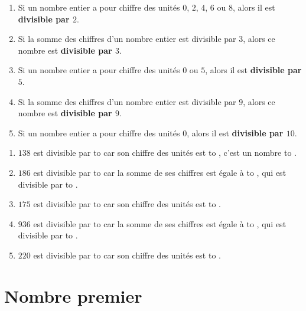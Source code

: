 \documentclass[12pt]{article}
\newif\iftrou\troutrue
\newlength{\trouwidth}
\newcommand{\trou}[1]{%
	\iftrou%
	\settowidth{\trouwidth}{#1}%
	\hbox to \trouwidth{\dotfill}%
	\else%
	#1%
	\fi}
\begin{document}
\begin{prop}{}{}
	\begin{enumerate}
		\item Si un nombre entier a pour chiffre des unités $0$, $2$, $4$, $6$ ou $8$, alors il est \textbf{divisible par $2$}.
		\item Si la somme des chiffres d'un nombre entier est divisible par $3$, alors ce nombre est \textbf{divisible par $3$}.
		\item Si un nombre entier a pour chiffre des unités $0$ ou $5$, alors il est \textbf{divisible par $5$}.
		\item Si la somme des chiffres d'un nombre entier est divisible par $9$, alors ce nombre est \textbf{divisible par $9$}.
		\item Si un nombre entier a pour chiffre des unités $0$, alors il est \textbf{divisible par $10$}.
	\end{enumerate}
\end{prop}

\begin{ex}{}{}
	\begin{enumerate}
		\item $138$ est divisible par \trou{$2$} car son chiffre des unités est \trou{$8$}, c'est un nombre \trou{pair}.
		\item $186$ est divisible par \trou{$3$} car la somme de ses chiffres est égale à \trou{$15$}, qui est divisible par \trou{$3$}. 
		\item $175$ est divisible par \trou{$5$} car son chiffre des unités est \trou{$5$}.
		\item $936$ est divisible par \trou{$9$} car la somme de ses chiffres est égale à \trou{$18$}, qui est divisible par \trou{$9$}.
		\item $220$ est divisible par \trou{$10$} car son chiffre des unités est \trou{$0$}.
	\end{enumerate}
\end{ex}

\newpage

\section{Nombre premier}
\end{document}
